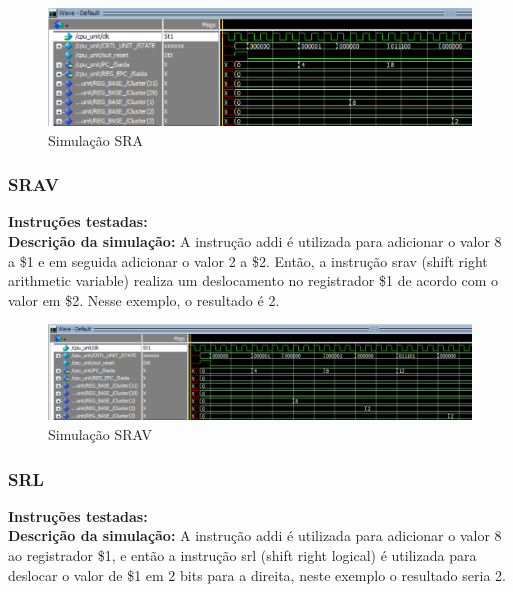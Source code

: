 \begin{figure}[htbp!]
\centering
\includegraphics[width=1\textwidth]{figure/simulacao_sra.png}
\caption{Simulação SRA} 
\label{fig:imagem_massa}
\end{figure}

\newpage

\subsubsection{SRAV}
\textbf{Instruções testadas:}
 \\

\textbf{Descrição da simulação:} A instrução addi é utilizada para adicionar o valor 8 a \$1 e em seguida adicionar o valor 2 a \$2. Então, a instrução srav (shift right arithmetic variable) realiza um deslocamento no registrador \$1 de acordo com o valor em \$2. Nesse exemplo, o resultado é 2.  \\

\begin{figure}[htbp!]
\centering
\includegraphics[width=1\textwidth]{figure/simulacao_srav.png}
\caption{Simulação SRAV} 
\label{fig:imagem_massa}
\end{figure}

\subsubsection{SRL}
\textbf{Instruções testadas:}
 \\

\textbf{Descrição da simulação:} A instrução addi é utilizada para adicionar o valor 8 ao registrador \$1, e então a instrução srl (shift right logical) é utilizada para deslocar o valor de \$1 em 2 bits para a direita, neste exemplo o resultado seria 2. \\

